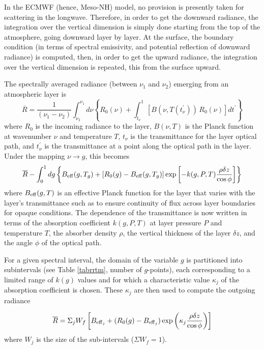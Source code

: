 In the ECMWF (hence, Meso-NH) model, no provision is presently taken for scattering in the longwave. Therefore, in order to get the downward radiance, the integration over the vertical dimension is simply done starting from the top of the atmosphere, going downward layer by layer. At the surface, the boundary condition (in terms of spectral emissivity, and potential reflection of downward radiance) is computed, then, in order to get the upward radiance, the integration over the vertical dimension is repeated, this from the surface upward.

The spectrally averaged radiance (between $\nu_1$ and $\nu_2$) emerging from an atmospheric layer is
\begin{equation}
\overline{R} = \frac{1}{(\nu_1 - \nu_2)} \int_{\nu_2}^{\nu_1} d\nu
\left\{ R_0(\nu) + \int_{t_\nu}^{1} \left[ B(\nu, T(t^\prime_\nu))
\, R_0(\nu) \right] dt^\prime \right\}
\end{equation}
where $R_0$ is the incoming radiance to the layer, $B(\nu, T )$ is the Planck function at wavenumber $\nu$ and temperature $T$, $t_\nu$ is the transmittance for the layer optical path, and $t^\prime_\nu$ is the transmittance at a point along the optical path in the layer. Under the mapping $\nu \rightarrow g$, this becomes
\begin{equation}
\overline{R} - \int_{0}^{1} dg \left\{  B_{\rm eff}(g,T_g)
+ \left[ R_0(g) - B_{\rm eff}(g,T_g) \right] 
\exp \left[-k(g,P,T) \frac{\rho \delta z}{\cos \phi} \right] \right\}
\end{equation}
where $B_{\rm eff}(g,T)$ is an effective Planck function for the layer that varies with the layer's transmittance such as to ensure continuity of flux across layer boundaries for opaque conditions. The dependence of the transmittance is now written in terms of the absorption coefficient $k(g,P,T)$ at layer pressure $P$ and temperature $T$, the absorber density $\rho$, the vertical thickness of the layer $\delta z$, and the angle $\phi$ of the optical path.


For a given spectral interval, the domain of the variable $g$ is partitioned into subintervals (see Table  \ref{tabrrtm}, number of $g$-points), each corresponding to a limited range of $k(g)$ values and for which a characteristic value $\kappa_j$ of the absorption coefficient is chosen. These $\kappa_j$ are then used to compute the outgoing radiance

  	
\begin{equation}
\overline{R} = \Sigma_j W_f \left[ B_{{\rm eff}_j} + (R_0(g) - B_{{\rm eff}_j})
\exp \left( \kappa_j \frac{\rho \delta z}{\cos \phi} \right) \right]
\end{equation}
where $W_j$ is the size of the sub-intervals ($\Sigma W_f =1$).


